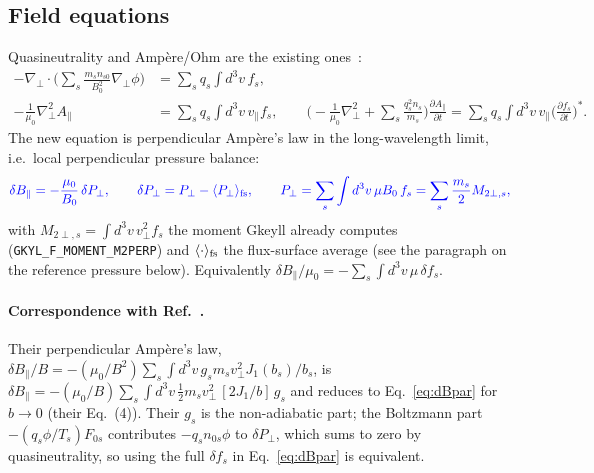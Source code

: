 \documentclass[11pt, letterpaper]{article}
\newcommand{\dBpar}{\delta B_\parallel}
\newcommand{\vpar}{v_\parallel}
\newcommand{\Apar}{A_\parallel}
\newcommand{\code}[1]{\texttt{#1}}
\newcommand{\new}[1]{\textcolor{blue}{#1}}
\begin{document}
\subsection{Field equations}
Quasineutrality and Amp\`ere/Ohm are the existing ones~\cite{Mandell2020}:
\begin{align}
  -\nabla_\perp\cdot\Big(\sum_s \frac{m_s n_{s0}}{B_0^2}\nabla_\perp\phi\Big) &= \sum_s q_s\!\int\! d^3v\, f_s,\\
  -\frac{1}{\mu_0}\nabla_\perp^2\Apar &= \sum_s q_s\!\int\! d^3v\, \vpar f_s,
  \qquad
  \Big(-\frac{1}{\mu_0}\nabla_\perp^2 + \sum_s\frac{q_s^2 n_s}{m_s}\Big)\frac{\partial\Apar}{\partial t}
   = \sum_s q_s\!\int\! d^3v\,\vpar\Big(\frac{\partial f_s}{\partial t}\Big)^{\!*}.
\end{align}
The new equation is perpendicular Amp\`ere's law in the long-wavelength limit, i.e.\ local
perpendicular pressure balance:
\begin{equation}
  \new{\dBpar = -\frac{\mu_0}{B_0}\,\delta P_\perp,\qquad
  \delta P_\perp = P_\perp - \langle P_\perp\rangle_{\rm fs},\qquad
  P_\perp = \sum_s \int d^3v\, \mu B_0\, f_s = \sum_s \frac{m_s}{2} M_{2\perp,s},}
  \label{eq:dBpar}
\end{equation}
with $M_{2\perp,s} = \int d^3v\, v_\perp^2 f_s$ the moment Gkeyll already computes
(\code{GKYL\_F\_MOMENT\_M2PERP}) and $\langle\cdot\rangle_{\rm fs}$ the flux-surface average
(see the paragraph on the reference pressure below). Equivalently
$\dBpar/\mu_0 = -\sum_s\int d^3v\,\mu\,\delta f_s$.

\paragraph{Correspondence with Ref.~\cite{Kennedy2024}.}
Their perpendicular Amp\`ere's law,
$\dBpar/B = -(\mu_0/B^2)\sum_s\int d^3v\, g_s m_s v_\perp^2 J_1(b_s)/b_s$, is
$\dBpar = -(\mu_0/B)\sum_s\int d^3v\,\tfrac{1}{2}m_s v_\perp^2\,[2J_1/b]\,g_s$ and reduces to
Eq.~\eqref{eq:dBpar} for $b\to0$ (their Eq.~(4)). Their $g_s$ is the non-adiabatic part; the
Boltzmann part $-(q_s\phi/T_s)F_{0s}$ contributes $-q_s n_{0s}\phi$ to $\delta P_\perp$, which sums
to zero by quasineutrality, so using the full $\delta f_s$ in Eq.~\eqref{eq:dBpar} is equivalent.
\end{document}
